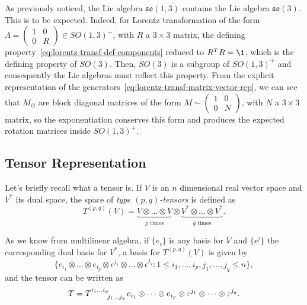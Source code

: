 As previously noticed, the Lie algebra $\mathfrak{so}(1,3)$ contains the Lie algebra $\mathfrak{so}(3)$. This is to be expected. Indeed, for Lorentz transformation of the form $\Lambda = \left(\begin{smallmatrix} 1 & 0 \\ 0 & R \end{smallmatrix} \right) \in SO(1,3)^+$, with $R$ a $3 \times 3$ matrix, the defining property~\eqref{eq:lorentz-transf-def-components} reduced to $R^TR = \1$, which is the defining property of $SO(3)$. Then, $SO(3)$ is a subgroup of $SO(1,3)^+$ and consequently the Lie algebras must reflect this property. From the explicit representation of the generators~\eqref{eq:lorentz-transf-matrix-vector-rep}, we can see that $M_{ij}$ are block diagonal matrices of the form $M \sim \left( \begin{smallmatrix} 1 & 0 \\ 0 & N \end{smallmatrix} \right) $, with $N$ a $3 \times 3$ matrix, so the exponentiation conserves this form and produces the expected rotation matrices inside $SO(1,3)^+$.


\subsection{Tensor Representation}
Let's briefly recall what a tensor is. If $V$ is an $n$ dimensional real vector space and $V^*$ its dual space, the space of \emph{type $(p,q)$-tensors} is defined as
\begin{equation}
    T^{(p,q)}(V) = 
    \underbrace{V \otimes \dots \otimes V}_\text{$p$ times}
    \otimes
    \underbrace{V^* \otimes \dots \otimes V^*}_\text{$q$ times} .
\end{equation}

As we know from multilinear algebra, if $\{e_i\}$ is any basis for $V$ and $\{\epsilon^j\}$ the corresponding dual basis for $V^*$, a basis for $T^{(p,q)}(V)$ is given by
\begin{equation}
    \{ e_{i_1} \otimes \dots \otimes e_{i_p} \otimes \epsilon^{j_1} \otimes \dots \otimes \epsilon^{j_q} : 1 \leq i_1, \dots, i_p, j_1, \dots, j_q \leq n \},
\end{equation}
and the tensor can be written as
\begin{equation}
    T = \tensor{T}{^{i_1}^\dots^{i_p}_{j_1}_\dots_{j_q}} e_{i_1} \otimes \dots \otimes e_{i_p} \otimes \epsilon^{j_1} \otimes \dots \otimes \epsilon^{j_q}.
\end{equation}

